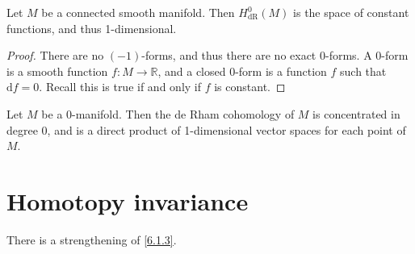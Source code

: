 \begin{proposition}\label{6.2.2}
	Let $M$ be a connected smooth manifold. Then $H^0_{\mathrm{dR} } (M)$ is the space of constant functions, and thus 1-dimensional.
\end{proposition}
\begin{proof}
	There are no $(-1)$-forms, and thus there are no exact 0-forms. A 0-form is a smooth function $f : M \to \mathbb{R} $, and a closed 0-form is a function $f$ such that $\mathrm{d} f=0$. Recall this is true if and only if $f$ is constant.
\end{proof}

\begin{proposition}\label{6.2.3}
	Let $M$ be a 0-manifold. Then the de Rham cohomology of $M$ is concentrated in degree 0, and is a direct product of 1-dimensional vector spaces for each point of $M$.
\end{proposition}

\section{Homotopy invariance}

There is a strengthening of \cref{6.1.3}.
